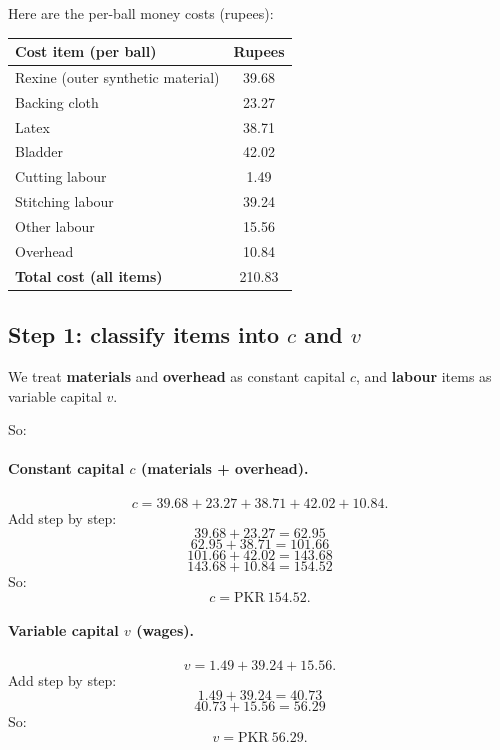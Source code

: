 \documentclass[11pt]{article}
\newcommand{\PKR}{\text{PKR}}
\newcommand{\cconst}{c} %
\newcommand{\vvar}{v}   %
\begin{document}
Here are the per-ball money costs (rupees):
\begin{center}
\begin{longtable}{@{}lS[table-format=3.2]@{}}
\toprule
\textbf{Cost item (per ball)} & {\textbf{Rupees}} \\
\midrule
Rexine (outer synthetic material)      & 39.68 \\
Backing cloth                          & 23.27 \\
Latex                                  & 38.71 \\
Bladder                                & 42.02 \\
Cutting labour                          & 1.49 \\
Stitching labour                        & 39.24 \\
Other labour                            & 15.56 \\
Overhead                                & 10.84 \\
\midrule
\textbf{Total cost (all items)}         & 210.83 \\
\bottomrule
\end{longtable}
\end{center}

\subsection{Step 1: classify items into \(\cconst\) and \(\vvar\)}
We treat \textbf{materials} and \textbf{overhead} as constant capital \(\cconst\),
and \textbf{labour} items as variable capital \(\vvar\).

So:

\paragraph{Constant capital \(\cconst\) (materials + overhead).}
\[
  \cconst = 39.68 + 23.27 + 38.71 + 42.02 + 10.84.
\]
Add step by step:
\[
  39.68 + 23.27 = 62.95
\]
\[
  62.95 + 38.71 = 101.66
\]
\[
  101.66 + 42.02 = 143.68
\]
\[
  143.68 + 10.84 = 154.52
\]
So:
\[
  \cconst = \PKR{}~154.52.
\]

\paragraph{Variable capital \(\vvar\) (wages).}
\[
  \vvar = 1.49 + 39.24 + 15.56.
\]
Add step by step:
\[
  1.49 + 39.24 = 40.73
\]
\[
  40.73 + 15.56 = 56.29
\]
So:
\[
  \vvar = \PKR{}~56.29.
\]
\end{document}
